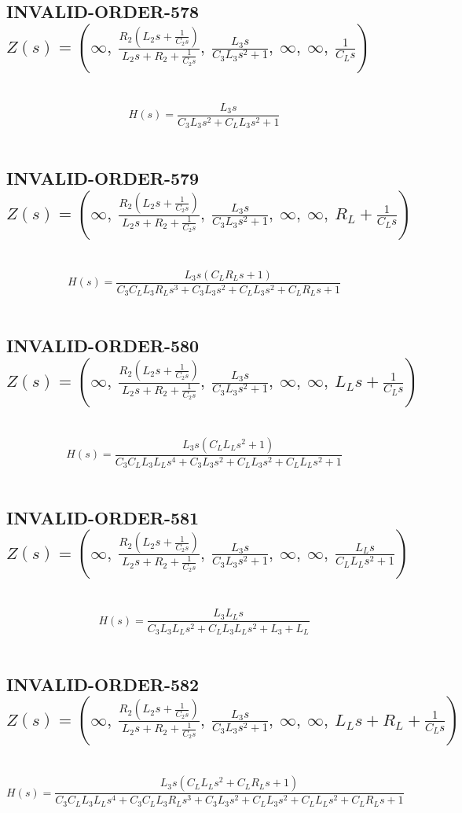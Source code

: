 \documentclass{article}
\begin{document}
\subsection{INVALID-ORDER-578 $Z(s) = \left( \infty, \  \frac{R_{2} \left(L_{2} s + \frac{1}{C_{2} s}\right)}{L_{2} s + R_{2} + \frac{1}{C_{2} s}}, \  \frac{L_{3} s}{C_{3} L_{3} s^{2} + 1}, \  \infty, \  \infty, \  \frac{1}{C_{L} s}\right)$ } \ 
\textbf{\[H(s) = \frac{L_{3} s}{C_{3} L_{3} s^{2} + C_{L} L_{3} s^{2} + 1}\] } \ 
\subsection{INVALID-ORDER-579 $Z(s) = \left( \infty, \  \frac{R_{2} \left(L_{2} s + \frac{1}{C_{2} s}\right)}{L_{2} s + R_{2} + \frac{1}{C_{2} s}}, \  \frac{L_{3} s}{C_{3} L_{3} s^{2} + 1}, \  \infty, \  \infty, \  R_{L} + \frac{1}{C_{L} s}\right)$ } \ 
\textbf{\[H(s) = \frac{L_{3} s \left(C_{L} R_{L} s + 1\right)}{C_{3} C_{L} L_{3} R_{L} s^{3} + C_{3} L_{3} s^{2} + C_{L} L_{3} s^{2} + C_{L} R_{L} s + 1}\] } \ 
\subsection{INVALID-ORDER-580 $Z(s) = \left( \infty, \  \frac{R_{2} \left(L_{2} s + \frac{1}{C_{2} s}\right)}{L_{2} s + R_{2} + \frac{1}{C_{2} s}}, \  \frac{L_{3} s}{C_{3} L_{3} s^{2} + 1}, \  \infty, \  \infty, \  L_{L} s + \frac{1}{C_{L} s}\right)$ } \ 
\textbf{\[H(s) = \frac{L_{3} s \left(C_{L} L_{L} s^{2} + 1\right)}{C_{3} C_{L} L_{3} L_{L} s^{4} + C_{3} L_{3} s^{2} + C_{L} L_{3} s^{2} + C_{L} L_{L} s^{2} + 1}\] } \ 
\subsection{INVALID-ORDER-581 $Z(s) = \left( \infty, \  \frac{R_{2} \left(L_{2} s + \frac{1}{C_{2} s}\right)}{L_{2} s + R_{2} + \frac{1}{C_{2} s}}, \  \frac{L_{3} s}{C_{3} L_{3} s^{2} + 1}, \  \infty, \  \infty, \  \frac{L_{L} s}{C_{L} L_{L} s^{2} + 1}\right)$ } \ 
\textbf{\[H(s) = \frac{L_{3} L_{L} s}{C_{3} L_{3} L_{L} s^{2} + C_{L} L_{3} L_{L} s^{2} + L_{3} + L_{L}}\] } \ 
\subsection{INVALID-ORDER-582 $Z(s) = \left( \infty, \  \frac{R_{2} \left(L_{2} s + \frac{1}{C_{2} s}\right)}{L_{2} s + R_{2} + \frac{1}{C_{2} s}}, \  \frac{L_{3} s}{C_{3} L_{3} s^{2} + 1}, \  \infty, \  \infty, \  L_{L} s + R_{L} + \frac{1}{C_{L} s}\right)$ } \ 
\textbf{\[H(s) = \frac{L_{3} s \left(C_{L} L_{L} s^{2} + C_{L} R_{L} s + 1\right)}{C_{3} C_{L} L_{3} L_{L} s^{4} + C_{3} C_{L} L_{3} R_{L} s^{3} + C_{3} L_{3} s^{2} + C_{L} L_{3} s^{2} + C_{L} L_{L} s^{2} + C_{L} R_{L} s + 1}\] } \ 
\end{document}
